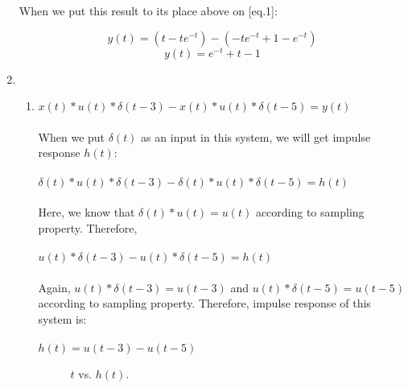 \documentclass[10pt,a4paper, margin=1in]{article}
\begin{document}
\begin{enumerate}
When we put this result to its place above on [eq.1]:

\[y(t) = (t -te^{-t}) - (-te^{-t} + 1-e^{-t}) \]
\[y(t) = e^{-t} +t -1\]


\item %
    \begin{enumerate}
    \item %
    $x(t) * u(t) * \delta(t-3) - x(t) * u(t) * \delta(t-5) =y(t)$ \\
    \\
    When we put $\delta(t)$ as an input in this system, we will get impulse response $h(t)$: \\
    \\
    $\delta(t) * u(t) * \delta(t-3) - \delta(t) * u(t) * \delta(t-5) =h(t)$ \\
    \\
    Here, we know that $\delta(t) * u(t) = u(t)$ according to sampling property. Therefore, \\
    \\
    $u(t) * \delta(t-3) - u(t) * \delta(t-5) =h(t)$ \\
    \\
    Again, $u(t) * \delta(t-3) = u(t-3)$ and $u(t) * \delta(t-5) = u(t-5)$ according to sampling property. Therefore, impulse response of this system is: \\
    \\
     $h(t) = u(t-3) - u(t-5)$ 
     \\
     
     \begin{figure}[H]
    \centering
        \caption{$t$ vs. $h(t)$.}
        \label{fig:q7_a}
    \end{figure}
    

\end{enumerate}
\end{enumerate}
\end{document}
